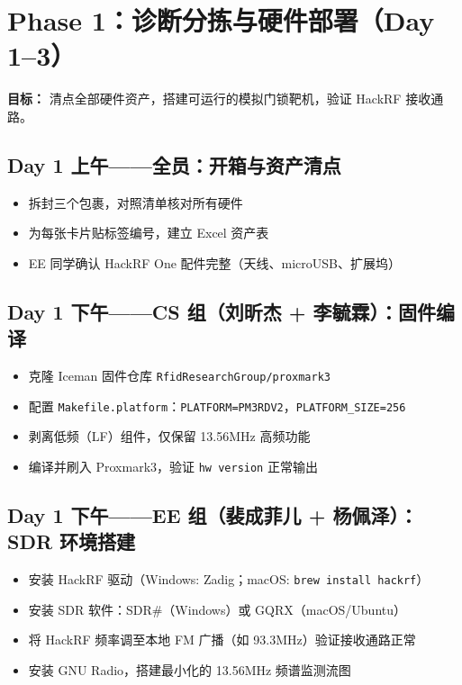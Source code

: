 \documentclass[12pt,a4paper]{ctexart}
\begin{document}
\section{Phase 1：诊断分拣与硬件部署（Day 1--3）}

\textbf{目标：} 清点全部硬件资产，搭建可运行的模拟门锁靶机，验证 HackRF 接收通路。

\subsection*{Day 1 上午——全员：开箱与资产清点}
\begin{itemize}[nosep]
    \item 拆封三个包裹，对照清单核对所有硬件
    \item 为每张卡片贴标签编号，建立 Excel 资产表
    \item EE 同学确认 HackRF One 配件完整（天线、microUSB、扩展坞）
\end{itemize}

\subsection*{Day 1 下午——CS 组（刘昕杰 + 李毓霖）：固件编译}
\begin{itemize}[nosep]
    \item 克隆 Iceman 固件仓库 \texttt{RfidResearchGroup/proxmark3}
    \item 配置 \texttt{Makefile.platform}：\texttt{PLATFORM=PM3RDV2}，\texttt{PLATFORM\_SIZE=256}
    \item 剥离低频（LF）组件，仅保留 13.56MHz 高频功能
    \item 编译并刷入 Proxmark3，验证 \texttt{hw version} 正常输出
\end{itemize}

\subsection*{Day 1 下午——EE 组（裴成菲儿 + 杨佩泽）：SDR 环境搭建}
\begin{itemize}[nosep]
    \item 安装 HackRF 驱动（Windows: Zadig；macOS: \texttt{brew install hackrf}）
    \item 安装 SDR 软件：SDR\#（Windows）或 GQRX（macOS/Ubuntu）
    \item 将 HackRF 频率调至本地 FM 广播（如 93.3MHz）验证接收通路正常
    \item 安装 GNU Radio，搭建最小化的 13.56MHz 频谱监测流图
\end{itemize}
\end{document}
